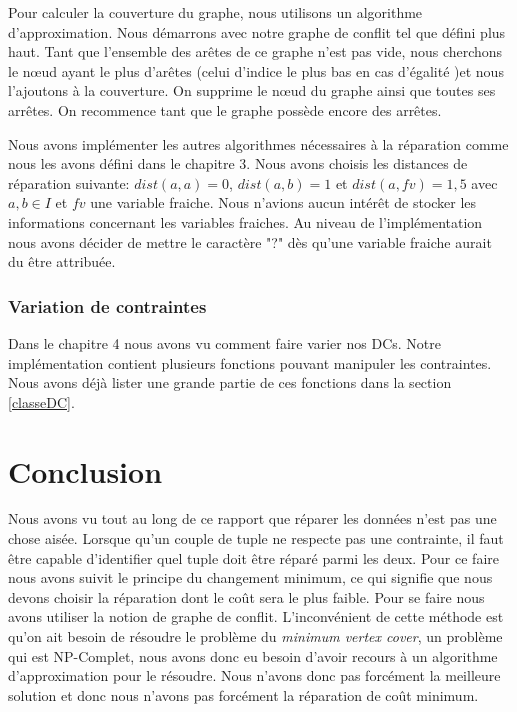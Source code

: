 \documentclass[letterpaper, 12pt]{report}
\theoremstyle{definition}
\begin{document}
Pour calculer la couverture du graphe, nous utilisons un algorithme d'approximation. Nous démarrons avec notre graphe de conflit tel que défini plus haut. Tant que l'ensemble des arêtes de ce graphe n'est pas vide, nous cherchons le nœud ayant le plus d'arêtes (celui d'indice le plus bas en cas d'égalité )et nous l'ajoutons à la couverture. On supprime le nœud du graphe ainsi que toutes ses arrêtes. On recommence tant que le graphe possède encore des arrêtes.

Nous avons implémenter les autres algorithmes nécessaires à la réparation comme nous les avons défini dans le chapitre 3. Nous avons choisis les distances de réparation suivante: $dist(a,a) =0$, $dist(a,b) =1$ et $dist(a,fv)=1,5$ avec $a,b \in I$ et $fv$ une variable fraiche. Nous n'avions aucun intérêt de stocker les informations concernant les variables fraiches. Au niveau de l'implémentation nous avons décider de mettre le caractère "?" dès qu'une variable fraiche aurait du être attribuée.

\subsection{Variation de contraintes}

Dans le chapitre 4 nous avons vu comment faire varier nos DCs. Notre implémentation contient plusieurs fonctions pouvant manipuler les contraintes. Nous avons déjà lister une grande partie de ces fonctions dans la section \ref{classeDC}.


\chapter{Conclusion}

Nous avons vu tout au long de ce rapport que réparer les données n'est pas une chose aisée. Lorsque qu'un couple de tuple ne respecte pas une contrainte, il faut être capable d'identifier quel tuple doit être réparé parmi les deux. Pour ce faire nous avons suivit le principe du changement minimum, ce qui signifie que nous devons choisir la réparation dont le coût sera le plus faible. Pour se faire nous avons utiliser la notion de graphe de conflit. L'inconvénient de cette méthode est qu'on ait besoin de résoudre le problème du \emph{minimum vertex cover}, un problème qui est NP-Complet, nous avons donc eu besoin d'avoir recours à un algorithme d'approximation pour le résoudre. Nous n'avons donc pas forcément la meilleure solution et donc nous n'avons pas forcément la réparation de coût minimum.\\
\end{document}
